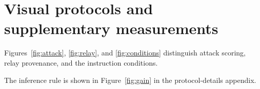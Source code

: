 \ifdefined\FloatBarrier\FloatBarrier\else\clearpage\fi
\section{Visual protocols and supplementary measurements}
\suppressfloats[t]
Figures~\ref{fig:attack}, \ref{fig:relay}, and \ref{fig:conditions} distinguish
attack scoring, relay provenance, and the instruction conditions.




The inference rule is shown in Figure~\ref{fig:gain} in the protocol-details appendix.

